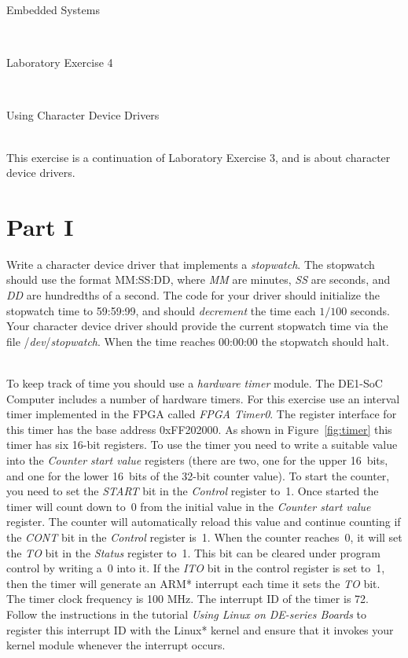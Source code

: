 \documentclass[epsfig,10pt,fullpage]{article}
\newcommand{\LabNum}{4}
\begin{document}
\centerline{\huge Embedded Systems}
~\\
\centerline{\huge Laboratory Exercise \LabNum}
~\\
\centerline{\large Using Character Device Drivers}
~\\

This exercise is a continuation of Laboratory Exercise 3, and is about character device
drivers. 

\section*{Part I}
\noindent
Write a character device driver that implements a {\it stopwatch}. The stopwatch 
should use the format MM:SS:DD, where {\it MM} are minutes, 
{\it SS} are seconds, and {\it DD} are hundredths of a second. The code for your driver 
should initialize the stopwatch time to 59:59:99, and should 
{\it decrement} the time each $1/100$ seconds. Your character device driver should 
provide the current stopwatch time via the file /{\it dev}/{\it stopwatch}. When the 
time reaches 00:00:00 the stopwatch should halt. 

~\\
\noindent
To keep track of time you should use a {\it hardware timer} module. The DE1-SoC Computer 
includes a number of hardware timers.  For this exercise use an interval timer implemented 
in the FPGA called {\it FPGA Timer0}. The register interface for this timer has the base 
address {\sf 0xFF202000}. As shown in Figure~\ref{fig:timer} this timer has six 16-bit 
registers. To use the timer you need to write a suitable value into the {\it Counter start value}
registers (there are two, one for the upper 16~bits, and one for the lower 16~bits of the 
32-bit counter value). To start the counter, you need to set the {\it START} bit in the 
{\it Control} register to~1. Once started the timer will count down to~0 from the initial 
value in the {\it Counter start value} register.  The counter will automatically reload this 
value and continue counting if the {\it CONT} bit in the {\it Control} register is~1. When the 
counter reaches~0, it will set the {\it TO} bit in the {\it Status} register to~1.
This bit can be cleared under program control by writing a~0 into it. If the 
{\it ITO} bit in the control register is set to~1, then the timer will generate an ARM* 
interrupt each time it sets the {\it TO} bit. The timer clock frequency is 100 MHz. 
The interrupt ID of the timer is 72. Follow the instructions in the tutorial {\it Using Linux 
on DE-series Boards} to register this interrupt ID with the Linux* kernel and ensure that it invokes 
your kernel module whenever the interrupt occurs.
\end{document}
